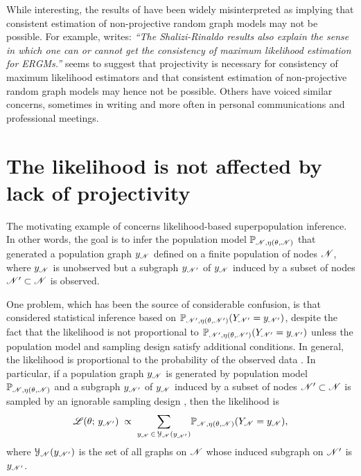 \documentclass[12pt]{article}
\begin{document}
While interesting,
the results of \citeauthor{ShRi11} have been widely misinterpreted as implying that consistent estimation of non-projective random graph models may not be possible.
For example,
\citet[page~831]{Fien12} writes:
\emph{\enquote{The Shalizi-Rinaldo results also explain the sense in which one can or cannot get the consistency of maximum likelihood estimation for ERGMs.}}
\citet{Fien12} seems to suggest that projectivity is necessary for consistency of maximum likelihood estimators and that consistent estimation of non-projective random graph models may hence not be possible.
Others have voiced similar concerns,
sometimes in writing \citep[][]{YaLeZh11} and more often in personal communications and professional meetings.

\section{The likelihood is not affected by lack of projectivity}
\label{super}

The motivating example of \citet{ShRi11} concerns likelihood-based superpopulation inference.
In other words,
the goal is to infer the population model $\mathbb{P}_{\mathscr{N},\eta(\theta, \mathscr{N})}$ that generated a population graph $y_{\mathscr{N}}$ defined on a finite population of nodes $\mathscr{N}$,
where $y_{\mathscr{N}}$ is unobserved but a subgraph $y_{\mathscr{N}'}$ of $y_{\mathscr{N}}$ induced by a subset of nodes $\mathscr{N}' \subset \mathscr{N}$ is observed.

One problem, 
which has been the source of considerable confusion,
is that\linebreak 
\citeauthor{ShRi11} considered statistical inference based on $\mathbb{P}_{\mathscr{N}',\eta(\theta, \mathscr{N}')}(Y_{\mathscr{N}'} = y_{\mathscr{N}'})$,
despite the fact that the likelihood is not proportional to $\mathbb{P}_{\mathscr{N}',\eta(\theta, \mathscr{N}')}(Y_{\mathscr{N}'} = y_{\mathscr{N}'})$ unless the population model and sampling design satisfy additional conditions. 
In general,
the likelihood is proportional to the probability of the observed data \citep{Fi22}.
In particular,
if a population graph $y_{\mathscr{N}}$ is generated by population model $\mathbb{P}_{\mathscr{N},\eta(\theta, \mathscr{N})}$ and a subgraph $y_{\mathscr{N}'}$ of $y_{\mathscr{N}}$ induced by a subset of nodes $\mathscr{N}' \subset \mathscr{N}$ is sampled by an ignorable sampling design \citep{HaGi09},
then the likelihood is
\begin{equation}
\label{likelihood}
\operatorname{\mathscr{L}}(\theta;\, y_{\mathscr{N}'})
\;\propto\; {\sum_{y_{\mathscr{N}}\, \in\, \mathcal{Y}_{\mathscr{N}}(y_{\mathscr{N}'})}}\mathbb{P}_{\mathscr{N},\eta(\theta, \mathscr{N})}(Y_{\mathscr{N}} = y_{\mathscr{N}}),
\end{equation}
where $\mathcal{Y}_{\mathscr{N}}(y_{\mathscr{N}'})$ is the set of all graphs on $\mathscr{N}$ whose induced subgraph on $\mathscr{N}'$ is $y_{\mathscr{N}'}$.
\end{document}
